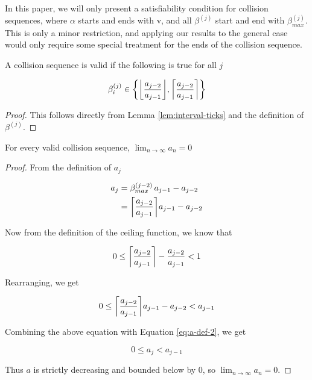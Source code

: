 
In this paper, we will only present a satisfiability condition for collision sequences, where $\alpha$ starts and ends with v, and all $\beta^{(j)}$ start and end with $\beta^{(j)}_{max}$. This is only a minor restriction, and applying our results to the general case would only require some special treatment for the ends of the collision sequence.


\begin{theorem}\label{thm:beta_i}
	A collision sequence is valid if the following is true for all $j$

	\begin{equation}
		\beta^{(j)}_i \in \cbracket{\floor{\frac{a_{j-2}}{a_{j-1}}}, \ceil{\frac{a_{j-2}}{a_{j-1}}}}
	\end{equation}
\end{theorem}

\begin{proof}
	This follows directly from Lemma \ref{lem:interval-ticks} and the definition of $\beta^{(j)}$.
\end{proof}


\begin{theorem}
	For every valid collision sequence, ${\displaystyle \lim_{n \to \infty} a_n = 0}$
\end{theorem}

\begin{proof}
	From the definition of $a_j$

	\begin{align}\label{eq:a-def-2}
		a_j& = \beta^{(j-2)}_{max} \, a_{j-1} - a_{j-2}\\
		& =  \ceil{\frac{a_{j-2}}{a_{j-1}}} a_{j-1} - a_{j-2}
	\end{align}

	Now from the definition of the ceiling function, we know that

	\begin{equation}
		0 \le \ceil{\frac{a_{j-2}}{a_{j-1}}} - \frac{a_{j-2}}{a_{j-1}} < 1
	\end{equation}

	Rearranging, we get

	\begin{equation}
		0 \le \ceil{\frac{a_{j-2}}{a_{j-1}}} a_{j-1} - a_{j-2} < a_{j-1}
	\end{equation}

	Combining the above equation with Equation \ref{eq:a-def-2}, we get

	\begin{equation}
		0 \le a_j < a_{j-1}
	\end{equation}

	Thus $a$ is strictly decreasing and bounded below by 0, so ${\displaystyle \lim_{n \to \infty} a_n = 0}$.
\end{proof}
